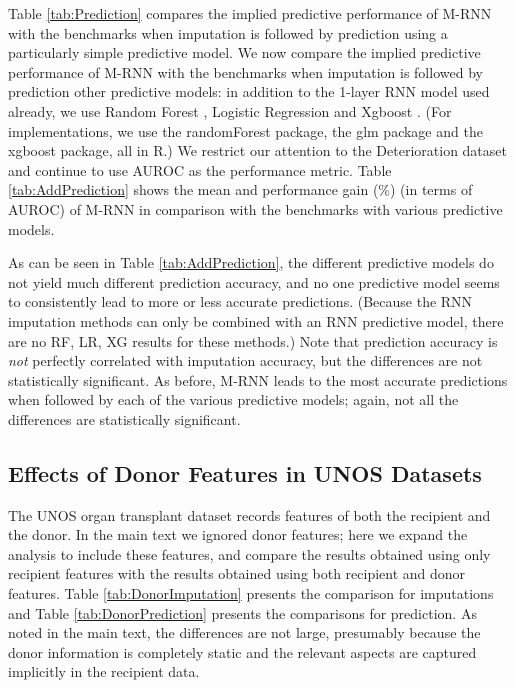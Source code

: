 \documentclass{article}
\begin{document}
Table \ref{tab:Prediction} compares the implied predictive performance of M-RNN with the benchmarks when imputation is followed by prediction using a particularly simple predictive model.  We now compare the implied predictive performance of  M-RNN with the benchmarks when imputation is followed by prediction other predictive models: in addition to the 1-layer RNN model used already, we use Random Forest \cite{rforest}, Logistic Regression and Xgboost \cite{xgboost}. (For implementations, we use the randomForest package, the glm package and the xgboost package, all in R.)  We restrict our attention to the Deterioration dataset and continue to use AUROC as the performance metric.  Table \ref{tab:AddPrediction} shows the mean and performance gain (\%) (in terms of AUROC) of M-RNN in comparison with the benchmarks with various predictive models.  

As can be seen in  Table \ref{tab:AddPrediction}, the different predictive models do not yield much different prediction accuracy, and no one predictive model seems to consistently lead to more or less accurate predictions. (Because the RNN imputation methods \cite{Recent_RNN1,Recent_RNN2,Recent_RNN3} can only be combined with an RNN predictive model, there are no RF, LR, XG results for these methods.) Note that  prediction accuracy is {\em not} perfectly correlated with  imputation accuracy, but the differences are not statistically significant.  As before, M-RNN leads to the most accurate predictions when followed by each of the various predictive models; again, not all the differences are statistically significant. 	

\subsection*{Effects of Donor Features in UNOS Datasets}
The UNOS organ transplant dataset records features of both the recipient and the donor.  In the main text we ignored donor features; here we expand the analysis to include these features, and compare the results obtained  using only recipient features  with the results obtained using both recipient and donor features. Table \ref{tab:DonorImputation} presents the comparison for imputations and Table \ref{tab:DonorPrediction} presents the comparisons for prediction. As noted in the main text, the differences are not large, presumably because the donor information is completely static and the relevant aspects are captured implicitly in the recipient data.
  
\end{document}

